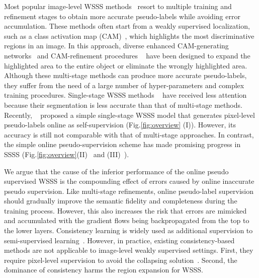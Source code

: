 \documentclass[twocolumn]{svjour3}          \smartqed  \usepackage{graphicx}
\makeatletter
\newcommand{\Fig}{Fig.\@\xspace}
\makeatother
\begin{document}
Most popular image-level WSSS methods~\citep{AhnCK19:IRN,dong_2020:conta,SunWDG20:MCIS} resort to multiple training and refinement stages to obtain more accurate pseudo-labels while avoiding error accumulation.
These methods often start from a weakly supervised localization, such as a class activation map (CAM)~\citep{ZhouKLOT16:CAM}, which highlights the most discriminative regions in an image.
In this approach, diverse enhanced CAM-generating networks~\citep{LeeKLLY19:FickleNet,WangZKSC20:SEAM,SunWDG20:MCIS} and CAM-refinement procedures ~\citep{AhnK18:PSA,AhnCK19:IRN,Shimoda2019:SSDD} have been designed to expand the highlighted area to the entire object or eliminate the wrongly highlighted area.
Although these multi-stage methods can produce more accurate pseudo-labels, they suffer from the need of a large number of hyper-parameters and complex training procedures.
Single-stage WSSS methods ~\citep{Zheng15:CRFRNN,PapandreouCMY15:EM} have received less attention because their segmentation is less accurate than that of multi-stage methods.
Recently, ~\cite{Araslanov020:SingleStage} proposed a simple single-stage WSSS model that generates pixel-level pseudo-labels online as self-supervision (\Fig\ref{fig:overview} (I)). However, its accuracy is still not comparable with that of multi-stage approaches.
In contrast, the simple online pseudo-supervision scheme has made promising progress in SSSS (\Fig\ref{fig:overview}(II)~\citep{Chen2021:CrossPseudo} and (III)~\citep{zou2020:pseudoseg}).

We argue that the cause of the inferior performance of the online pseudo supervised WSSS is the compounding effect of errors caused by online inaccurate pseudo supervision.
Like multi-stage refinements, online pseudo-label supervision should gradually improve the semantic fidelity and completeness during the training process.
However, this also increases the risk that errors are mimicked and accumulated with the gradient flows being backpropagated from the top to the lower layers.
Consistency learning is widely used as additional supervision to semi-supervised learning~\citep{OualiHT20:CCT,Chen2021:CrossPseudo}. 
However, in practice, existing consistency-based methods are not applicable to image-level weakly supervised settings. 
First, they require pixel-level supervision to avoid the collapsing solution~\citep{Xinlei:SimSiam}. Second, the dominance of consistency harms the region expansion for WSSS.
\end{document}
